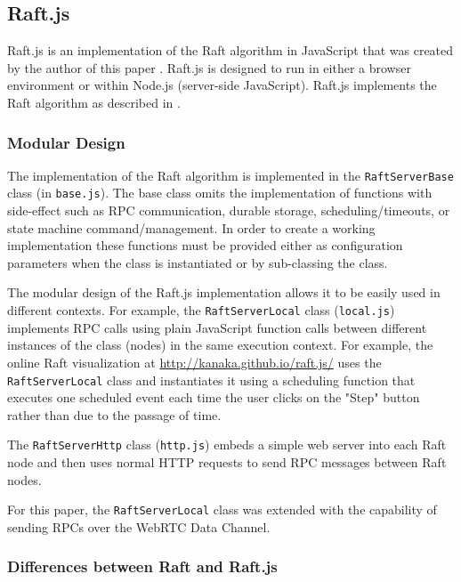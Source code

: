 \documentclass[9pt]{extarticle}
\begin{document}
\begin{multicols}{2}

\subsection{Raft.js}

Raft.js is an implementation of the Raft algorithm in JavaScript that
was created by the author of this paper \cite{raft.js}.  Raft.js is
designed to run in either a browser environment or within Node.js
(server-side JavaScript). Raft.js implements the Raft algorithm as
described in \cite[Consensus:~Diego]{raft_thesis:ongaro14}.

\subsubsection{Modular Design}

The implementation of the Raft algorithm is implemented in the
\texttt{RaftServerBase} class (in \texttt{base.js}). The base class
omits the implementation of functions with side-effect such as RPC
communication, durable storage, scheduling/timeouts, or state machine
command/management. In order to create a working implementation these
functions must be provided either as configuration parameters when the
class is instantiated or by sub-classing the class.

The modular design of the Raft.js implementation allows it to be
easily used in different contexts. For example, the \texttt{RaftServerLocal}
class (\texttt{local.js}) implements RPC calls using plain JavaScript function
calls between different instances of the class (nodes) in the same
execution context. For example, the online Raft visualization at
\href{http://kanaka.github.io/raft.js/}{http://kanaka.github.io/raft.js/}
\cite{raft.js:visualization} uses the \texttt{RaftServerLocal} class
and instantiates it using a scheduling function that executes one
scheduled event each time the user clicks on the "Step" button rather
than due to the passage of time.

The \texttt{RaftServerHttp} class (\texttt{http.js}) embeds a simple
web server into each Raft node and then uses normal HTTP requests to
send RPC messages between Raft nodes.

For this paper, the \texttt{RaftServerLocal} class was extended with
the capability of sending RPCs over the WebRTC Data Channel.

\subsubsection{Differences between Raft and Raft.js}


\end{multicols}
\end{document}
